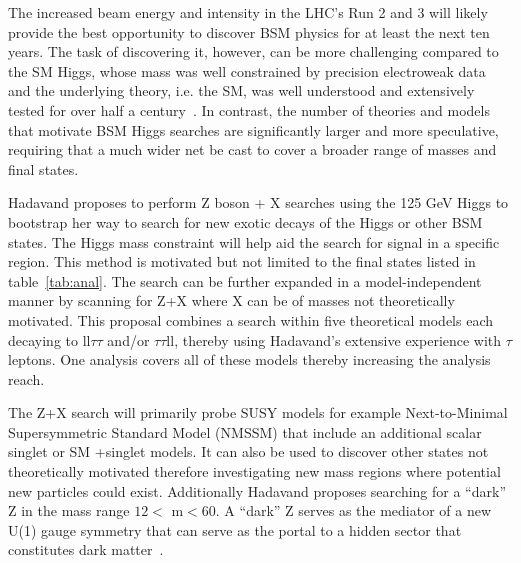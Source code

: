 \label{ZplusX}
The increased beam energy and intensity in the LHC’s Run 2 and 3 will likely provide the best 
opportunity to discover BSM physics for at least the next ten years.
The task of discovering it, however, can be more challenging compared to the SM Higgs, whose mass was well constrained by precision electroweak data and the underlying theory, i.e. the SM, 
was well understood and extensively tested for over half a century~\cite{eng,higgs1,higgs2,higgs3}. 
In contrast, the number of theories and models that motivate BSM Higgs searches are significantly larger and more speculative, requiring that a much wider net be cast to cover a broader range of masses and final states. 

Hadavand proposes to perform Z boson + X searches using the 125 GeV Higgs to bootstrap her way to search for new exotic decays of the Higgs or other BSM states.  
The Higgs mass constraint will help aid the search for signal in a specific region.  %
This method is motivated but not limited to the final states listed in table~\ref{tab:anal}. The search can be further expanded in a model-independent manner by scanning for Z+X where X can be of masses not theoretically motivated.
This proposal combines a search within five theoretical models each decaying to ll$\tau\tau$ and/or $\tau\tau$ll, thereby using Hadavand's extensive experience with $\tau$ leptons.  One analysis
covers all of these models thereby increasing the analysis reach.  

The Z+X search will primarily probe SUSY models for example Next-to-Minimal Supersymmetric Standard Model (NMSSM) that include an additional scalar singlet or SM +singlet models.  It can also be used to discover other states not theoretically motivated therefore investigating new mass regions where potential new particles could exist.
Additionally Hadavand proposes searching for a ``dark'' Z in the mass range $12<$ m$<60$. A ``dark'' Z serves as the mediator of a new U(1) gauge symmetry that can serve as the portal to a hidden sector that constitutes dark matter~\cite{zdark}. 


